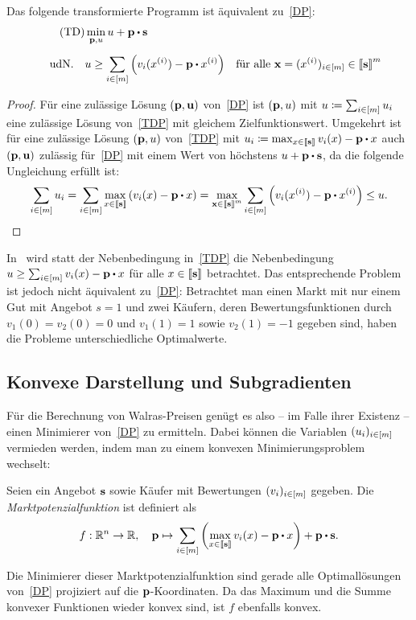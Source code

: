 \begin{lemma}
	Das folgende transformierte Programm ist äquivalent zu~\eqref{DP}: \emph{
	\begin{align*}
		\tag{TD}\label{TDP}
		&\min_{\fp, u} u + \fp \bcdot \fs \\[5pt]
	\text{udN.}\quad& u \geq \sum_{i\in\first{m}} \left( v_i(x^{(i)}) - \fp \bcdot x^{(i)} \right) & \text{für alle $\fx = (x^{(i)})_{i\in\first{m}}\in\ffirst{\fs}^m$}
	\end{align*}
}
\end{lemma}
\begin{proof}
	Für eine zulässige Lösung $(\mathbf{p}, \mathbf{u})$ von~\eqref{DP} ist $(\mathbf{p}, u)$ mit $u\coloneqq \sum_{i\in\left[ m \right]} u_i$ eine zulässige Lösung von~\eqref{TDP} mit gleichem Zielfunktionswert.
	Umgekehrt ist für eine zulässige Lösung $(\mathbf{p}, u)$ von~\eqref{TDP} mit $u_i\coloneqq \max_{x\in\ffirst{\fs}} v_i(x) - \fp \bcdot x$ auch $(\mathbf{p}, \mathbf{u})$ zulässig für~\eqref{DP} mit einem Wert von höchstens $u+\fp\bcdot \fs$, da die folgende Ungleichung erfüllt ist: \[
		\sum_{i\in\first{m}} u_i = \sum_{i\in\first{m}} \max_{x\in\ffirst{\fs}} \left( v_i(x) - \fp \bcdot x \right) = \max_{\fx\in\ffirst{\fs}^m} \sum_{i\in\first{m}} \left( v_i(x^{(i)}) - \fp \bcdot x^{(i)} \right) \leq u.
		\vspace{-15pt}
	\]
\end{proof}
\begin{bemerkung} 
	In~\cite{PaesLeme2018} wird statt der Nebenbedingung in~\eqref{TDP} die Nebenbedingung $u \geq \sum_{i\in\first{m}} v_i(x) - \fp \bcdot x$ für alle $x\in\left\llbracket \mathbf{s} \right\rrbracket$ betrachtet.
	Das entsprechende Problem ist jedoch nicht äquivalent zu~\eqref{DP}:
	Betrachtet man einen Markt mit nur einem Gut mit Angebot $s=1$ und zwei Käufern, deren Bewertungsfunktionen durch $v_1(0)=v_2(0)=0$ und $v_1(1)=1$ sowie $v_2(1) = -1$ gegeben sind, haben die Probleme unterschiedliche Optimalwerte.
\end{bemerkung}

\subsection{Konvexe Darstellung und Subgradienten}

Für die Berechnung von Walras-Preisen genügt es also -- im Falle ihrer Existenz -- einen Minimierer von~\eqref{DP} zu ermitteln.
Dabei können die Variablen $(u_i)_{i\in\left[ m \right]}$ vermieden werden, indem man zu einem konvexen Minimierungsproblem wechselt:
\begin{definition}
	Seien ein Angebot $\mathbf{s}$ sowie Käufer mit Bewertungen $(v_i)_{i\in\left[ m \right]}$ gegeben. Die \emph{Marktpotenzialfunktion} ist definiert als
	\[ f:\R^n \rightarrow \R,\quad \fp \mapsto \sum_{i\in\first{m}} \left( \max_{x\in\ffirst{\fs}} v_i(x) - \fp \bcdot x \right) + \fp \bcdot \fs. \]
\end{definition}
Die Minimierer dieser Marktpotenzialfunktion sind gerade alle Optimallösungen von~\eqref{DP} projiziert auf die $\mathbf{p}$-Koordinaten.
Da das Maximum und die Summe konvexer Funktionen wieder konvex sind, ist $f$ ebenfalls konvex.

